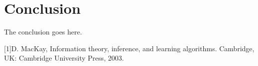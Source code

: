 \documentclass[journal]{IEEEtran}
\begin{document}
\section{Conclusion}


The conclusion goes here.

\ifCLASSOPTIONcaptionsoff
  \newpage
\fi
\begin{thebibliography}{1}
	
 [1]D. MacKay, Information theory, inference, and learning algorithms. Cambridge, UK: Cambridge University Press, 2003.
\end{thebibliography}



\end{document}
